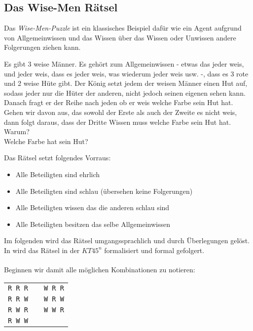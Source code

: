 

\subsection{Das Wise-Men Rätsel} %
\label{sub:das_wise_men_raetsel}

Das \emph{Wise-Men-Puzzle} ist ein klassisches Beispiel dafür wie ein Agent aufgrund von Allgemeinwissen und das Wissen über das Wissen oder Unwissen andere Folgerungen ziehen kann.

\begin{puzzle}
	\label{puz:wiseMen}
	Es gibt 3 weise Männer.
	Es gehört zum Allgemeinwissen - etwas das jeder weis, und jeder weis, dass es jeder weis, was wiederum jeder weis usw. -, dass es 3 rote und 2 weise Hüte gibt.
	Der König setzt jedem der weisen Männer einen Hut auf, sodass jeder nur die Hüter der anderen, nicht jedoch seinen eigenen sehen kann.
	Danach fragt er der Reihe nach jeden ob er weis welche Farbe sein Hut hat.
	Gehen wir davon aus, das sowohl der Erste als auch der Zweite es nicht weis, dann folgt daraus, dass der Dritte Wissen muss welche Farbe sein Hut hat.
	\\
	Warum?\\
	Welche Farbe hat sein Hut?
\end{puzzle}
%
%
Das Rätsel setzt folgendes Vorraus:
\begin{itemize}
	\item Alle Beteiligten sind ehrlich
	\item Alle Beteiligten sind schlau (übersehen keine Folgerungen)
	\item Alle Beteiligten wissen das die anderen schlau sind
	\item Alle Beteiligten besitzen das selbe Allgemeinwissen
\end{itemize}
%
%
Im folgenden wird das Rätsel umgangssprachlich und durch Überlegungen gelöst. In  wird das Rätsel in der \MML $KT45^n$ formalisiert und formal gefolgert.\\
\\
Beginnen wir damit alle möglichen Kombinationen zu notieren:\\
%
\begin{tabular}{ccc}
\texttt{R R R} &   & \texttt{W R R}\\
\texttt{R R W} &   & \texttt{W R W}\\
\texttt{R W R} &   & \texttt{W W R}\\
\texttt{R W W} &   &   \\
\end{tabular}
